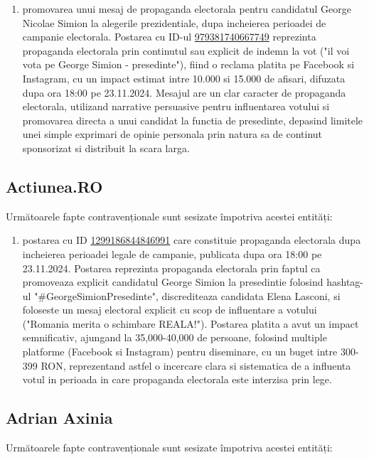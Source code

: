 \documentclass[a4paper,12pt]{article}
\begin{document}
\begin{enumerate}[leftmargin=*, label=\arabic*.)]
    \item promovarea unui mesaj de propaganda electorala pentru candidatul George Nicolae Simion la alegerile prezidentiale, dupa incheierea perioadei de campanie electorala. Postarea cu ID-ul \href{https://www.facebook.com/ads/library/?id=979381740667749}{979381740667749} reprezinta propaganda electorala prin continutul sau explicit de indemn la vot ("il voi vota pe George Simion - presedinte"), fiind o reclama platita pe Facebook si Instagram, cu un impact estimat intre 10.000 si 15.000 de afisari, difuzata dupa ora 18:00 pe 23.11.2024. Mesajul are un clar caracter de propaganda electorala, utilizand narrative persuasive pentru influentarea votului si promovarea directa a unui candidat la functia de presedinte, depasind limitele unei simple exprimari de opinie personala prin natura sa de continut sponsorizat si distribuit la scara larga.
\end{enumerate}

\vspace{0.5cm}

\subsection{Actiunea.RO}
Următoarele fapte contravenționale sunt sesizate împotriva acestei entități:

\begin{enumerate}[leftmargin=*, label=\arabic*.)]
    \item postarea cu ID \href{https://www.facebook.com/ads/library/?id=1299186844846991}{1299186844846991} care constituie propaganda electorala dupa incheierea perioadei legale de campanie, publicata dupa ora 18:00 pe 23.11.2024. Postarea reprezinta propaganda electorala prin faptul ca promoveaza explicit candidatul George Simion la presedintie folosind hashtag-ul "\#GeorgeSimionPresedinte", discrediteaza candidata Elena Lasconi, si foloseste un mesaj electoral explicit cu scop de influentare a votului ("Romania merita o schimbare REALA!"). Postarea platita a avut un impact semnificativ, ajungand la 35,000-40,000 de persoane, folosind multiple platforme (Facebook si Instagram) pentru diseminare, cu un buget intre 300-399 RON, reprezentand astfel o incercare clara si sistematica de a influenta votul in perioada in care propaganda electorala este interzisa prin lege.
\end{enumerate}

\vspace{0.5cm}

\subsection{Adrian Axinia}
Următoarele fapte contravenționale sunt sesizate împotriva acestei entități:
\end{document}
